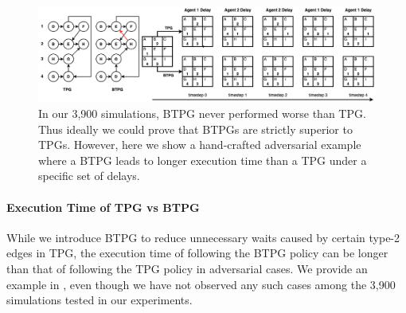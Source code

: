 \documentclass[letterpaper]{article} %
\theoremstyle{definition}
\begin{document}
\begin{figure}[h]
    \centering
    \includegraphics[width=\textwidth]{Figs/BTPGWorseEx.png}
    \caption{In our 3,900 simulations, BTPG never performed worse than TPG.
    Thus ideally we could prove that BTPGs are strictly superior to TPGs.
    However, here we show a hand-crafted adversarial example where a BTPG leads to longer execution time than a TPG under a specific set of delays.
    }
    \label{fig:counter-ex}
\end{figure}
\paragraph{Execution Time of TPG vs BTPG} While we introduce BTPG to reduce unnecessary waits caused by certain type-2 edges in TPG, the execution time of following the BTPG policy can be longer than that of following the TPG policy in adversarial cases. We provide an example in , even though we have not observed any such cases among the 3,900 simulations tested in our experiments.

\end{document}
